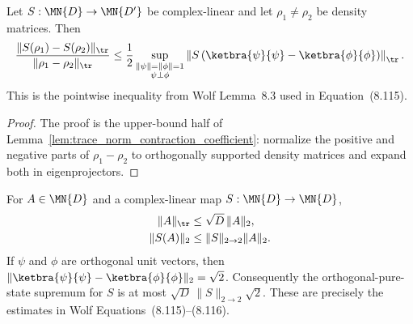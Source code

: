 \begin{lemma}
    \label{lem:trace_norm_contraction_pointwise}
    \leanok
    Let $S:\MN{D}\to\MN{D'}$ be complex-linear and let
    $\rho_1\neq\rho_2$ be density matrices. Then
    \begin{align}
        \frac{\lVert S(\rho_1)-S(\rho_2)\rVert_{\tr}}
        {\lVert\rho_1-\rho_2\rVert_{\tr}}
        \leq\frac12
        \sup_{\substack{\lVert\psi\rVert=\lVert\phi\rVert=1 \\
                \psi\perp\phi}}
        \left\lVert S\left(\ketbra{\psi}{\psi}
        -\ketbra{\phi}{\phi}\right)\right\rVert_{\tr}.
    \end{align}
    This is the pointwise inequality from Wolf Lemma~8.3 used in
    Equation~(8.115).
\end{lemma}

\begin{proof}\leanok
    The proof is the upper-bound half of
    Lemma~\ref{lem:trace_norm_contraction_coefficient}: normalize the positive
    and negative parts of $\rho_1-\rho_2$ to orthogonally supported density
    matrices and expand both in eigenprojectors.
\end{proof}

\begin{lemma}
    \label{lem:asymptotic_hilbert_schmidt_estimates}
    \leanok
    For $A\in\MN{D}$ and a complex-linear map $S:\MN{D}\to\MN{D}$,
    \begin{align}
        \lVert A\rVert_{\tr} & \leq\sqrt D\,\lVert A\rVert_2,              \\
        \lVert S(A)\rVert_2  & \leq\lVert S\rVert_{2\to2}\lVert A\rVert_2.
    \end{align}
    If $\psi$ and $\phi$ are orthogonal unit vectors, then
    $\lVert\ketbra{\psi}{\psi}-\ketbra{\phi}{\phi}\rVert_2=\sqrt2$.
    Consequently the orthogonal-pure-state supremum for $S$ is at most
    $\sqrt D\,\lVert S\rVert_{2\to2}\sqrt2$. These are precisely the
    estimates in Wolf Equations~(8.115)--(8.116).
\end{lemma}

